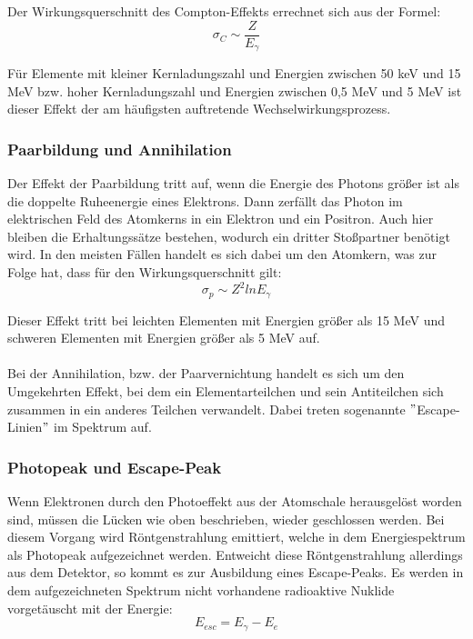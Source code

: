 
Der Wirkungsquerschnitt des Compton-Effekts errechnet sich aus der Formel:
	\begin{equation}
	\sigma_{C} \sim \frac{Z}{E_{\gamma}}
	\end{equation}
	
Für Elemente mit kleiner Kernladungszahl und Energien zwischen 50 keV und 15 MeV bzw. hoher Kernladungszahl und Energien zwischen 0,5 MeV und 5 MeV ist dieser Effekt der am häufigsten auftretende Wechselwirkungsprozess.

	\subsubsection*{Paarbildung und Annihilation}
	Der Effekt der Paarbildung tritt auf, wenn die Energie des Photons größer ist als die doppelte Ruheenergie eines Elektrons. Dann zerfällt das Photon im elektrischen Feld des Atomkerns in ein Elektron und ein Positron. Auch hier bleiben die Erhaltungssätze bestehen, wodurch ein dritter Stoßpartner benötigt wird. In den meisten Fällen handelt es sich dabei um den Atomkern, was zur Folge hat, dass für den Wirkungsquerschnitt gilt:
	\begin{equation}
	\sigma_{p} \sim Z^{2} ln E_{\gamma}
	\end{equation}

Dieser Effekt tritt bei leichten Elementen mit Energien größer als 15 MeV und schweren Elementen mit Energien größer als 5 MeV auf.\\
\\
Bei der Annihilation, bzw. der Paarvernichtung handelt es sich um den Umgekehrten Effekt, bei dem ein Elementarteilchen und sein Antiteilchen sich zusammen in ein anderes Teilchen verwandelt. Dabei treten sogenannte $"$Escape-Linien$"$ im Spektrum auf. 

	\subsubsection*{Photopeak und Escape-Peak}
	Wenn Elektronen durch den Photoeffekt aus der Atomschale herausgelöst worden sind, müssen die Lücken wie oben beschrieben, wieder geschlossen werden. Bei diesem Vorgang wird Röntgenstrahlung emittiert, welche in dem Energiespektrum als Photopeak aufgezeichnet werden. Entweicht diese Röntgenstrahlung allerdings aus dem Detektor, so kommt es zur Ausbildung eines Escape-Peaks. Es werden in dem aufgezeichneten Spektrum nicht vorhandene radioaktive Nuklide vorgetäuscht mit der Energie:
	\begin{equation}
	E_{esc} = E_{\gamma} - E_{e}
	\end{equation}

